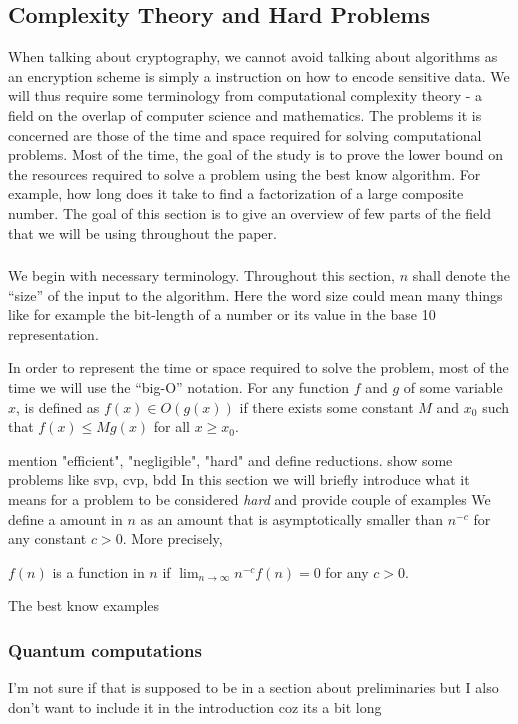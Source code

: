 
\subsection{Complexity Theory and Hard Problems} \label{hardness}
When talking about cryptography, we cannot avoid talking about algorithms as an encryption scheme is simply a instruction on how to encode sensitive data. We will thus require some terminology from computational complexity theory - a field on the overlap of computer science and mathematics. The problems it is concerned are those of the time and space required for solving computational problems. Most of the time, the goal of the study is to prove the lower bound on the resources required to solve a problem using the best know algorithm. For example, how long does it take to find a factorization of a large composite number. The goal of this section is to give an overview of few parts of the field that we will be using throughout the paper. 

\subsubsection*{}
We begin with necessary terminology. Throughout this section, $n$ shall denote the ``size'' of the input to the algorithm. Here the word size could mean many things like for example the bit-length of a number or its value in the base 10 representation.

In order to represent the time or space required to solve the problem, most of the time we will use the ``big-O'' notation. For any function $f$ and $g$ of some variable $x$, is defined as $f(x) \in O(g(x))$ if there exists some constant $M$ and $x_0$ such that $f(x) \leq Mg(x)$ for all $x \geq x_0$.

mention "efficient", "negligible", "hard" and define reductions. show some problems like svp, cvp, bdd
In this section we will briefly introduce what it means for a problem to be considered \textit{hard} and provide couple of examples
We define a  amount in $n$ as an amount that is asymptotically smaller than $n^{-c}$ for any constant $c > 0$. More precisely, 
\begin{definition}\label{negl}
    $f (n)$ is a  function in $n$ if $\lim_{n \to \infty}n^{-c} f (n) = 0$ for any $c > 0$.
\end{definition}
The best know examples
\subsubsection*{Quantum computations}
I'm not sure if that is supposed to be in a section about preliminaries but I also don't want to include it in the introduction coz its a bit long

